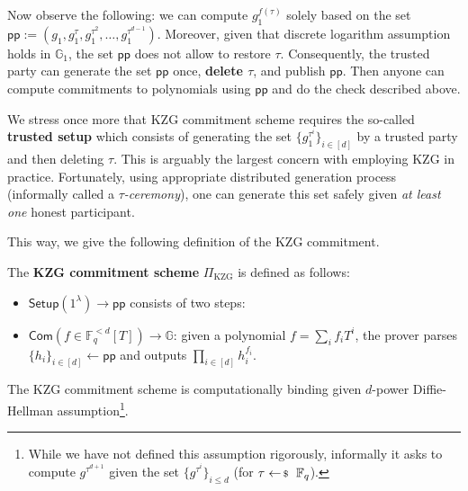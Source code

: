 \documentclass[../../book]{subfiles}
\begin{document}
Now observe the following: we can compute $g_1^{f(\tau)}$ solely based on the set $\mathsf{pp} := (g_1,g_1^{\tau},g_1^{\tau^2},\dots,g_1^{\tau^{d-1}})$.
Moreover, given that discrete logarithm assumption holds in $\mathbb{G}_1$, the set $\mathsf{pp}$ does not allow to restore $\tau$.
Consequently, the trusted party can generate the set $\mathsf{pp}$ once, \textbf{delete $\tau$}, and publish $\mathsf{pp}$.
Then anyone can compute commitments to polynomials using $\mathsf{pp}$ and do the check described above.

\begin{remark}
    We stress once more that KZG commitment scheme requires the so-called \textbf{trusted setup} which consists of generating the set $\{g_1^{\tau^i}\}_{i \in [d]}$ by a trusted party and then deleting $\tau$.
    This is arguably the largest concern with employing KZG in practice.
    Fortunately, using appropriate distributed generation process (informally called a \emph{$\tau$-ceremony}), one can generate this set safely given \textit{at least one} honest participant.
\end{remark}

This way, we give the following definition of the KZG commitment.

\begin{definition}\label{def:kzg-com}
    The \textbf{KZG commitment scheme} $\Pi_{\text{KZG}}$ is defined as follows:
    \begin{itemize}
        \item $\mathsf{Setup}(1^{\lambda}) \to \mathsf{pp}$ consists of two steps: 
        \item $\mathsf{Com}(f \in \mathbb{F}_q^{<d}[T]) \to \mathbb{G}$: given a polynomial $f = \sum_i f_iT^i$, the prover parses $\{h_i\}_{i \in [d]} \gets \mathsf{pp}$ and outputs $\prod_{i \in [d]} h_i^{f_i}$.
    \end{itemize}
\end{definition}

\begin{lemma}
    The KZG commitment scheme is computationally binding given $d$-power Diffie-Hellman assumption\footnote{While we have not defined this assumption rigorously, informally it asks to compute $g^{\tau^{d+1}}$ given the set $\{g^{\tau^i}\}_{i\leq d}$ (for $\tau \leftarrowS \mathbb{F}_q$).}.
\end{lemma}
\end{document}
